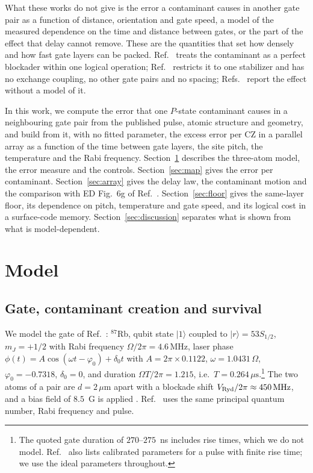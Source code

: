 \documentclass[aps,pra,twocolumn,superscriptaddress,longbibliography,floatfix]{revtex4-2}
\newcommand{\um}{\,\mu\mathrm{m}}
\newcommand{\us}{\,\mu\mathrm{s}}
\newcommand{\MHz}{\,\mathrm{MHz}}
\begin{document}
What these works do not give is the error a contaminant causes in another gate pair as a function of distance, orientation and gate speed, a model of the measured dependence on the time and distance between gates, or the part of the effect that delay cannot remove. These are the quantities that set how densely and how fast gate layers can be packed. Ref.~\cite{Cong2022} treats the contaminant as a perfect blockader within one logical operation; Ref.~\cite{Jandura2024} restricts it to one stabilizer and has no exchange coupling, no other gate pairs and no spacing; Refs.~\cite{Evered2023,Bluvstein2026} report the effect without a model of it.

In this work, we compute the error that one $P$-state contaminant causes in a neighbouring gate pair from the published pulse, atomic structure and geometry, and build from it, with no fitted parameter, the excess error per CZ in a parallel array as a function of the time between gate layers, the site pitch, the temperature and the Rabi frequency. Section~\ref{sec:model} describes the three-atom model, the error measure and the controls. Section~\ref{sec:map} gives the error per contaminant. Section~\ref{sec:array} gives the delay law, the contaminant motion and the comparison with ED Fig.~6g of Ref.~\cite{Bluvstein2026}. Section~\ref{sec:floor} gives the same-layer floor, its dependence on pitch, temperature and gate speed, and its logical cost in a surface-code memory. Section~\ref{sec:discussion} separates what is shown from what is model-dependent.

\section{Model}
\label{sec:model}

\subsection{Gate, contaminant creation and survival}

We model the gate of Ref.~\cite{Evered2023}: $^{87}$Rb, qubit state $|1\rangle$ coupled to $|r\rangle=53S_{1/2}$, $m_J=+1/2$ with Rabi frequency $\Omega/2\pi=4.6\MHz$, laser phase $\phi(t)=A\cos(\omega t-\varphi_0)+\delta_0 t$ with $A=2\pi\times0.1122$, $\omega=1.0431\,\Omega$, $\varphi_0=-0.7318$, $\delta_0=0$, and duration $\Omega T/2\pi=1.215$, i.e.\ $T=0.264\us$.\footnote{The quoted gate duration of $270$--$275$~ns includes rise times, which we do not model. Ref.~\cite{Evered2023} also lists calibrated parameters for a pulse with finite rise time; we use the ideal parameters throughout.} The two atoms of a pair are $d=2\um$ apart with a blockade shift $V_{\rm Ryd}/2\pi\approx450\MHz$, and a bias field of $8.5$~G is applied \cite{Evered2023}. Ref.~\cite{Bluvstein2026} uses the same principal quantum number, Rabi frequency and pulse.
\end{document}
